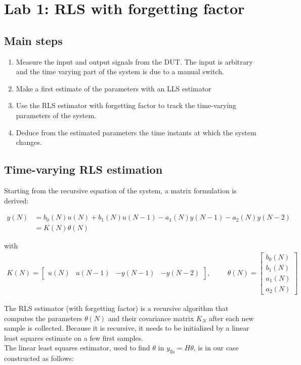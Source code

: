 \chapter{Lab 1: RLS with forgetting factor}

\section{Main steps}

\begin{enumerate}
    \item Measure the input and output signals from the DUT. The input is arbitrary and the time varying part of the system is due to a manual switch.
    \item Make a first estimate of the parameters with an LLS estimator
    \item Use the RLS estimator with forgetting factor to track the time-varying parameters of the system.
    \item Deduce from the estimated parameters the time instants at which the system changes.
\end{enumerate}

\section{Time-varying RLS estimation}

Starting from the recursive equation of the system, a matrix formulation is derived:

\begin{align}
    y(N) &= b_0(N) u(N) + b_1(N) u(N-1) - a_1(N) y(N-1) - a_2(N) y(N-2) \\
    &= K(N) \theta(N)
\end{align}

with
\begin{align}
    K(N) = \begin{bmatrix} u(N) & u(N-1) & -y(N-1) & -y(N-2) \end{bmatrix}, \hspace{1cm}
    \theta(N) = \begin{bmatrix} b_0(N) \\ b_1(N) \\ a_1(N) \\ a_2(N) \end{bmatrix}
\end{align}

The RLS estimator (with forgetting factor) is a recursive algorithm that computes the parameters $\theta (N)$ and their covariance matrix $K_N$ after each new sample is collected. Because it is recursive, it needs to be initialized by a linear least squares estimate on a few first samples. \\
The linear least squares estimator, used to find $\theta$ in $y_{\text{lls}} = H \theta$, is in our case constructed as follows:

